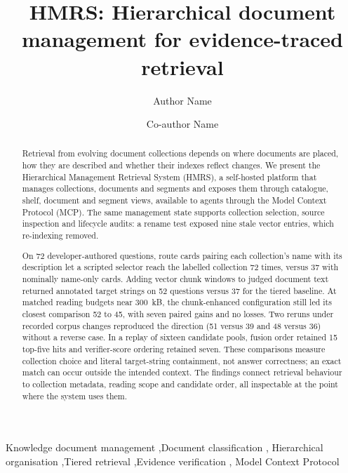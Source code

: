 \documentclass[review,12pt]{elsarticle}
\begin{document}
\begin{frontmatter}

\title{HMRS: Hierarchical document management for evidence-traced retrieval}

\author[inst1]{Author Name}
\author[inst1]{Co-author Name}

\begin{abstract}
Retrieval from evolving document collections depends on where documents are
placed, how they are described and whether their indexes reflect changes.
We present the Hierarchical Management Retrieval System (HMRS), a
self-hosted platform that manages collections, documents and segments and
exposes them through catalogue, shelf, document and segment views,
available to agents through the Model Context Protocol (MCP). The same
management state supports collection selection, source inspection and
lifecycle audits: a rename test exposed nine stale vector entries, which
re-indexing removed.

On 72 developer-authored questions, route cards pairing each collection's
name with its description let a scripted selector reach the labelled
collection 72 times, versus 37 with nominally name-only cards. Adding
vector chunk windows to judged document text returned annotated target
strings on 52 questions versus 37 for the tiered baseline. At matched
reading budgets near 300~kB, the chunk-enhanced configuration still led
its closest comparison 52 to 45, with seven paired gains and no losses.
Two reruns under recorded corpus changes reproduced the direction
(51 versus 39 and 48 versus 36) without a reverse case. In a replay of
sixteen candidate pools, fusion order retained 15 top-five hits and
verifier-score ordering retained seven. These comparisons measure
collection choice and literal target-string containment, not answer
correctness; an exact match can occur outside the intended context. The
findings connect retrieval behaviour to collection metadata, reading
scope and candidate order, all inspectable at the point where the system
uses them.
\end{abstract}

\begin{keyword}
Knowledge document management \sep Document classification \sep
Hierarchical organisation \sep Tiered retrieval \sep Evidence verification \sep
Model Context Protocol
\end{keyword}

\end{frontmatter}
















{\ifdefined\HMRSReviewLayout\else\footnotesize\fi
\setlength{\bibsep}{0.5pt plus 0.2ex}


}
\end{document}
